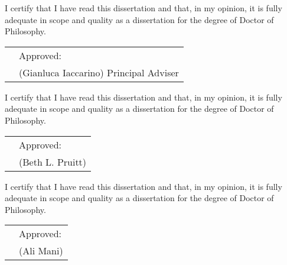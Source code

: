 \begin{dedication}
\vspace{-5cm}
\raggedright\setlength{\parindent}{5em} I certify that I have read this dissertation and that, in my opinion, it is fully \\ 
adequate in scope and quality as a dissertation for the degree of Doctor of \\
Philosophy. 

\begin{tabular}{@{}p{1.0in}p{4in}@{}}
 & Approved:\hrulefill \\
& (Gianluca Iaccarino) Principal Adviser \\
\end{tabular}
\newline
\newline
\newline

\raggedright\setlength{\parindent}{5em} I certify that I have read this dissertation and that, in my opinion, it is fully \\ 
adequate in scope and quality as a dissertation for the degree of Doctor of \\
Philosophy. 

\begin{tabular}{@{}p{1.0in}p{4in}@{}}
 & Approved:\hrulefill \\
& (Beth L. Pruitt) \\
\end{tabular}
\newline
\newline
\newline

\raggedright\setlength{\parindent}{5em} I certify that I have read this dissertation and that, in my opinion, it is fully \\ 
adequate in scope and quality as a dissertation for the degree of Doctor of \\
Philosophy. 

\begin{tabular}{@{}p{1.0in}p{4in}@{}}
 & Approved:\hrulefill \\
& (Ali Mani) \\
\end{tabular}

\end{dedication}
